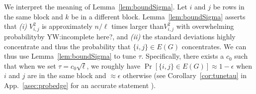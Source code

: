 We interpret the meaning of Lemma~\ref{lem:boundSigma}. Let $i$ and $j$ be rows in the same block and $k$ be in a different block. Lemma~\ref{lem:boundSigma} asserts that \emph{(i)} $V^2_{i,j}$ is approximately $n/\ell$ times larger than$V^2_{i, j}$ with overwhelming probability{\color{red}by YW:incomplete here?}, and \emph{(ii)} the standard deviations highly concentrate and thus the probability that $\{i, j\} \in E(G)$ concentrates. 
We can thus use Lemma~\ref{lem:boundSigma} to tune 
$\tau$. Specifically, there exists a $c_0$ such that when we set $\tau = c_0\sqrt{\ell}$, we roughly have $\Pr[\{i, j\} \in E(G)] \approx 1-\epsilon$ when $i$ and $j$ are in the same block and $\approx \epsilon$ otherwise
(see Corollary~\ref{cor:tunetau} in App.~\ref{asec:probedge} for an accurate statement ).

\iffalse
Before proceeding, let us interpret the meaning of Lemma~\ref{lem:boundSigma}. Let $i_1, j_1 \in B_1$ and $j_2 \in B_2$. One can see that $V_{i,j_2}$ is much smaller than $V_{i,j_1}$ (in the order of $n /\ell$). This means: 

{\color{blue} Insert by YW

The result here implies that $V^2_{i,j} = \Theta(\ell)$ when $i$ and $j$ are in the same block. It is intuitive in the sense that responses ($\mY$) from the same block are spanned by $\ell$ common random variables.

For the case that $i$ and $j$ are not in the same block, $V^2_{i,j} = \Theta(\frac{\ell^2}{n}) = \Theta(\frac{\ell}{n}\ell)$. (How to articulate the meaning of $\ell/n$?)
}
\fi

